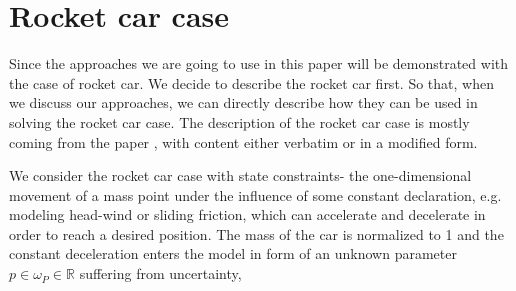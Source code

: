 

\chapter{Rocket car case}
Since the approaches we are going to use in this paper will be demonstrated with the case of rocket car. We decide to describe the rocket car first. So that, when we discuss our approaches, we can directly describe how they can be used in solving the rocket car case. The description of the rocket car case is mostly coming from the paper \cite{MatSch22}, with content either  verbatim or in a modified form. 

We consider the rocket car case with state constraints- the one-dimensional movement of a mass point under the influence of some constant declaration, e.g. modeling head-wind or sliding friction, which can accelerate and decelerate in order to reach a desired position. The mass of the car is normalized to 1 and the constant deceleration enters the model in form of an unknown parameter $p \in \omega_P \in \mathbb{R}$ suffering from uncertainty, 




